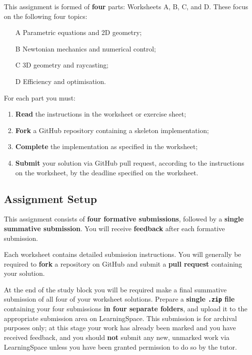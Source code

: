 \documentclass{../../fal_assignment}
\begin{document}
This assignment is formed of \textbf{four} parts: Worksheets A, B, C, and D.
These focus on the following four topics:
\begin{enumerate}
	\item[A] Parametric equations and 2D geometry;
	\item[B] Newtonian mechanics and numerical control;
	\item[C] 3D geometry and raycasting;
	\item[D] Efficiency and optimisation.
\end{enumerate}

For each part you must:
\begin{enumerate}[label=(\roman*)]
    \item \textbf{Read} the instructions in the worksheet or exercise sheet;
	\item \textbf{Fork} a GitHub repository containing a skeleton implementation;
    \item \textbf{Complete} the implementation as specified in the worksheet;
    \item \textbf{Submit} your solution via GitHub pull request, according to the instructions on the worksheet, by the deadline specified on the worksheet.
\end{enumerate}

\subsection*{Assignment Setup} 

This assignment consists of \textbf{four formative submissions}, followed by a \textbf{single summative submission}.
You will receive \textbf{feedback} after each formative submission.

Each worksheet contains detailed submission instructions. You will generally be required to \textbf{fork} a repository on GitHub and submit a \textbf{pull request} containing your solution.

At the end of the study block you will be required make a final summative submission of all four of your worksheet solutions.
Prepare a \textbf{single \texttt{.zip} file} containing your four submissions \textbf{in four separate folders}, and upload it to the appropriate submission area on LearningSpace. 
This submission is for archival purposes only; at this stage your work has already been marked and you have received feedback, and you should \textbf{not} submit any new, unmarked work via LearningSpace unless you have been granted permission to do so by the tutor.
\end{document}
